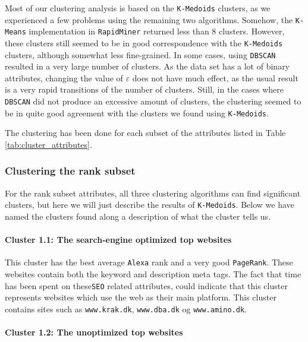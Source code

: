 Most of our clustering analysis is based on the \texttt{K-Medoids} clusters, as we experienced a few problems using the remaining two algorithms. Somehow, the \texttt{K-Means} implementation in \texttt{RapidMiner} returned less than 8 clusters. However, these clusters still seemed to be in good correspondence with the \texttt{K-Medoids} clusters, although somewhat less fine-grained. In some cases, using \texttt{DBSCAN} resulted in a very large number of clusters. As the data set has a lot of binary attributes, changing the value of $\varepsilon$ does not have much effect, as the usual result is a very rapid transitions of the number of clusters. Still, in the cases where \texttt{DBSCAN} did not produce an excessive amount of clusters, the clustering seemed to be in quite good agreement with the clusters we found using \texttt{K-Medoids}.

The clustering has been done for each subset of the attributes listed in Table \ref{tab:cluster_attributes}.

\subsubsection{Clustering the rank subset}

For the rank subset attributes, all three clustering algorithms can find significant clusters, but here we will just describe the results of \texttt{K-Medoids}. Below we have named the clusters found along a description of what the cluster tells us.

\paragraph{Cluster 1.1: The search-engine optimized top websites}

This cluster has the best average \texttt{Alexa} rank and a very good \texttt{PageRank}. These websites contain both the keyword and description meta tags. The fact that time has been spent on these\texttt{SEO} related attributes, could indicate that this cluster represents websites which use the web as their main platform. This cluster contains sites such as \verb|www.krak.dk|, \verb|www.dba.dk| og \verb|www.amino.dk|.

\paragraph{Cluster 1.2: The unoptimized top websites}

